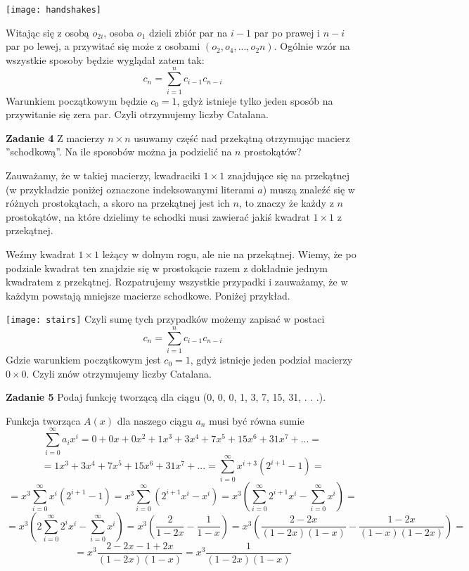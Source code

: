 \documentclass[12pt,a4paper]{article}
\begin{document}
\vskip 0.5cm
\texttt{[image: handshakes]}

Witając się z osobą \(o_{2i}\), osoba \( o_1 \) dzieli zbiór par na \(i-1\) par po prawej i \(n-i\) par po lewej, a przywitać się może z osobami \((o_2, o_4,...,o_2n)\). Ogólnie wzór na wszystkie sposoby będzie wyglądał zatem tak:
\[
	c_n = \sum_{i=1}^n c_{i-1}c_{n-i}
\]
Warunkiem początkowym będzie \(c_0 = 1\), gdyż istnieje tylko jeden sposób na przywitanie się zera par. Czyli otrzymujemy liczby Catalana.

\vskip 0.5cm
\noindent
\textbf{Zadanie 4} Z macierzy \( n \times n \) usuwamy część nad przekątną otrzymując macierz ''schodkową''. Na ile sposobów można ja podzielić na \(n\) prostokątów?

Zauważamy, że w takiej macierzy, kwadraciki \( 1\times 1\) znajdujące się na przekątnej (w przykładzie poniżej oznaczone indeksowanymi literami \(a\)) muszą znaleźć się w różnych prostokątach, a skoro na przekątnej jest ich \(n\), to znaczy że każdy z \(n\) prostokątów, na które dzielimy te schodki musi zawierać jakiś kwadrat 
\( 1 \times 1\) z przekątnej.

Weźmy kwadrat \( 1 \times 1\) leżący w dolnym rogu, ale nie na przekątnej. Wiemy, że po podziale kwadrat ten znajdzie się w prostokącie razem z dokładnie jednym kwadratem z przekątnej. Rozpatrujemy wszystkie przypadki i zauważamy, że w każdym powstają mniejsze macierze schodkowe. Poniżej przykład.

\texttt{[image: stairs]}
Czyli sumę tych przypadków możemy zapisać w postaci
\[
	c_n = \sum_{i=1}^n c_{i-1}c_{n-i}
\]
Gdzie warunkiem początkowym jest \( c_0 = 1 \), gdyż istnieje jeden podział macierzy \( 0 \times 0 \). Czyli znów otrzymujemy liczby Catalana.

\vskip 0.5cm
\noindent
\textbf{Zadanie 5} Podaj funkcję tworzącą dla ciągu (0, 0, 0, 1, 3, 7, 15, 31, . . .).

Funkcja tworząca \(A(x)\) dla naszego ciągu \( a_n \) musi być równa sumie
\[
	\sum_{i=0}^\infty a_ix^i = 0 + 0x + 0x^2 + 1x^3 + 3x^4 + 7x^5 + 15x^6 + 31x^7 + ... =
\]
\[
	 = 1x^3 + 3x^4 + 7x^5 + 15x^6 + 31x^7 + ... = \sum_{i=0}^\infty x^{i+3}(2^{i+1} - 1) =
\]
\[
	 = x^3\sum_{i=0}^\infty x^i(2^{i+1} - 1) 
	 = x^3\sum_{i=0}^\infty (2^{i+1}x^i - x^i)
	 = x^3(\sum_{i=0}^\infty2^{i+1}x^i - \sum_{i=0}^\infty x^i) =
\]
\[
	= x^3(2\sum_{i=0}^\infty2^i x^i - \sum_{i=0}^\infty x^i)
	= x^3\left(\frac{2}{1-2x}  -  \frac{1}{1-x} \right) 
	= x^3\left(\frac{2-2x}{(1-2x)(1-x)}  -  \frac{1-2x}{(1-x)(1-2x)} \right) =
\]
\[
	= x^3\frac{2-2x-1+2x}{(1-2x)(1-x)} 
	= x^3\frac{1}{(1-2x)(1-x)} 
\]
\end{document}
